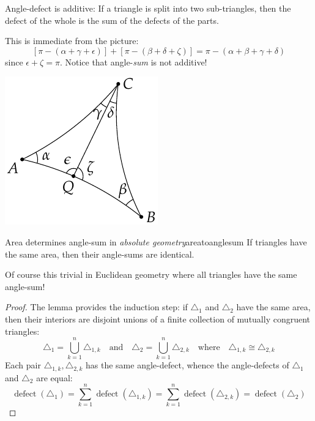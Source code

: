 \begin{minipage}[t]{0.74\linewidth}\vspace{0pt}
	\begin{lemm}{}{}
		Angle-defect is additive: If a triangle is split into two sub-triangles, then the defect of the whole is the sum of the defects of the parts.
	\end{lemm}
	
	This is immediate from the picture:
	\[
		\left[\pi-(\alpha+\gamma+\epsilon)\right]+\left[\pi-(\beta+\delta+\zeta)\right]=\pi-(\alpha+\beta+\gamma+\delta)
	\]
	since $\epsilon+\zeta=\pi$. Notice that angle-\emph{sum} is not additive!
\end{minipage}
\hfill
\begin{minipage}[t]{0.25\linewidth}\vspace{-15pt}
	\flushright\includegraphics{area-defect}
\end{minipage}



\begin{thm}{Area determines angle-sum in \emph{absolute geometry}}{areatoanglesum}
	If triangles have the same area, then their angle-sums are identical.
\end{thm}

Of course this trivial in Euclidean geometry where all triangles have the same angle-sum!

\begin{proof}
	The lemma provides the induction step: if $\triangle_1$ and $\triangle_2$ have the same area, then their interiors are disjoint unions of a finite collection of mutually congruent triangles:
	\[
		\triangle_1=\bigcup_{k=1}^n\triangle_{1,k}\quad\text{and}\quad \triangle_2=\bigcup_{k=1}^n\triangle_{2,k}\quad\text{where}\quad \triangle_{1,k}\cong\triangle_{2,k}
	\]
	Each pair $\triangle_{1,k},\triangle_{2,k}$ has the same angle-defect, whence the angle-defects of $\triangle_1$ and $\triangle_2$ are equal:
	\[
		\operatorname{defect}(\triangle_1)=\sum_{k=1}^n\operatorname{defect}(\triangle_{1,k}) =\sum_{k=1}^n\operatorname{defect}(\triangle_{2,k}) =\operatorname{defect}(\triangle_2)\tag*{\qedhere}
	\]
\end{proof}

